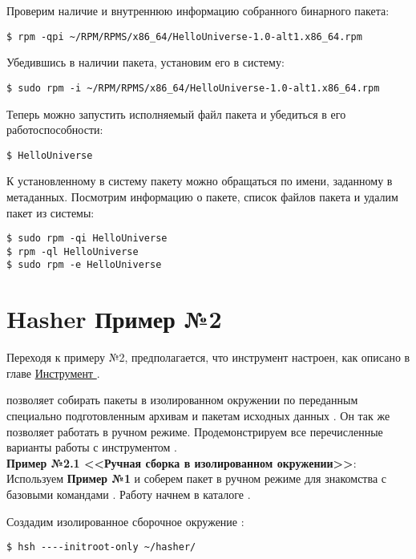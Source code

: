 Проверим наличие и внутреннюю информацию собранного бинарного пакета:
\begin{verbatim}
$ rpm -qpi ~/RPM/RPMS/x86_64/HelloUniverse-1.0-alt1.x86_64.rpm
\end{verbatim}

Убедившись в наличии пакета, установим его в систему:
\begin{verbatim}
$ sudo rpm -i ~/RPM/RPMS/x86_64/HelloUniverse-1.0-alt1.x86_64.rpm
\end{verbatim}

Теперь можно запустить исполняемый файл пакета и убедиться в его
работоспособности:
\begin{verbatim}
$ HelloUniverse
\end{verbatim}

К установленному в систему пакету можно обращаться по имени, заданному в
метаданных. Посмотрим информацию о пакете, список файлов пакета и удалим
пакет из системы:
\begin{verbatim}
$ sudo rpm -qi HelloUniverse
$ rpm -ql HelloUniverse
$ sudo rpm -e HelloUniverse
\end{verbatim}

\section{Hasher \textbf{Пример №2}}

Переходя к примеру №2, предполагается, что инструмент  настроен,
как описано в главе \hyperlink{5}{Инструмент }.

 позволяет собирать пакеты в изолированном окружении по
переданным специально подготовленным архивам  и пакетам
исходных данных . Он так же позволяет работать в ручном
режиме. Продемонстрируем все перечисленные варианты работы с
инструментом .\\

\textbf{Пример №2.1 <<Ручная сборка в изолированном окружении>>}:\\

Используем \textbf{Пример №1} и соберем пакет  в ручном режиме
для знакомства с базовыми командами . Работу начнем в
каталоге .

Создадим изолированное сборочное окружение :

\begin{verbatim}
$ hsh ----initroot-only ~/hasher/
\end{verbatim}

